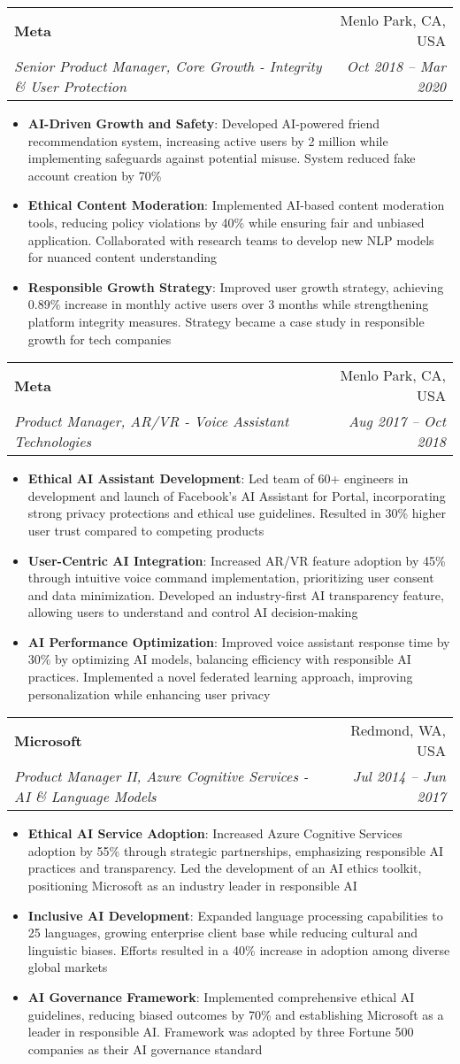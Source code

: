 \documentclass[letterpaper,11pt]{article}
\makeatletter
\newcommand{\resumeItem}[2]{
  \item\small{
    \textbf{#1}{: #2 \vspace{-2pt}}
  }
}
\newcommand{\resumeSubheading}[4]{
  \vspace{-1pt}\item
    \begin{tabular*}{0.97\textwidth}[t]{l@{\extracolsep{\fill}}r}
      \textbf{#1} & #2 \\
      \textit{\small#3} & \textit{\small #4} \\
    \end{tabular*}\vspace{-5pt}
}
\newcommand{\resumeItemListStart}{\begin{itemize}}
\newcommand{\resumeItemListEnd}{\end{itemize}\vspace{-5pt}}
\makeatother
\begin{document}
    \resumeSubheading
      {Meta}{Menlo Park, CA, USA}
      {Senior Product Manager, Core Growth - Integrity \& User Protection}{Oct 2018 -- Mar 2020}
      \resumeItemListStart
        \resumeItem{AI-Driven Growth and Safety}
          {Developed AI-powered friend recommendation system, increasing active users by 2 million while implementing safeguards against potential misuse. System reduced fake account creation by 70\%}
        \resumeItem{Ethical Content Moderation}
          {Implemented AI-based content moderation tools, reducing policy violations by 40\% while ensuring fair and unbiased application. Collaborated with research teams to develop new NLP models for nuanced content understanding}
        \resumeItem{Responsible Growth Strategy}
          {Improved user growth strategy, achieving 0.89\% increase in monthly active users over 3 months while strengthening platform integrity measures. Strategy became a case study in responsible growth for tech companies}
      \resumeItemListEnd

    \resumeSubheading
      {Meta}{Menlo Park, CA, USA}
      {Product Manager, AR/VR - Voice Assistant Technologies}{Aug 2017 -- Oct 2018}
      \resumeItemListStart
        \resumeItem{Ethical AI Assistant Development}
          {Led team of 60+ engineers in development and launch of Facebook's AI Assistant for Portal, incorporating strong privacy protections and ethical use guidelines. Resulted in 30\% higher user trust compared to competing products}
        \resumeItem{User-Centric AI Integration}
          {Increased AR/VR feature adoption by 45\% through intuitive voice command implementation, prioritizing user consent and data minimization. Developed an industry-first AI transparency feature, allowing users to understand and control AI decision-making}
        \resumeItem{AI Performance Optimization}
          {Improved voice assistant response time by 30\% by optimizing AI models, balancing efficiency with responsible AI practices. Implemented a novel federated learning approach, improving personalization while enhancing user privacy}
      \resumeItemListEnd

    \resumeSubheading
      {Microsoft}{Redmond, WA, USA}
      {Product Manager II, Azure Cognitive Services - AI \& Language Models}{Jul 2014 -- Jun 2017}
      \resumeItemListStart
        \resumeItem{Ethical AI Service Adoption}
          {Increased Azure Cognitive Services adoption by 55\% through strategic partnerships, emphasizing responsible AI practices and transparency. Led the development of an AI ethics toolkit, positioning Microsoft as an industry leader in responsible AI}
        \resumeItem{Inclusive AI Development}
          {Expanded language processing capabilities to 25 languages, growing enterprise client base while reducing cultural and linguistic biases. Efforts resulted in a 40\% increase in adoption among diverse global markets}
        \resumeItem{AI Governance Framework}
          {Implemented comprehensive ethical AI guidelines, reducing biased outcomes by 70\% and establishing Microsoft as a leader in responsible AI. Framework was adopted by three Fortune 500 companies as their AI governance standard}
      \resumeItemListEnd
\end{document}
